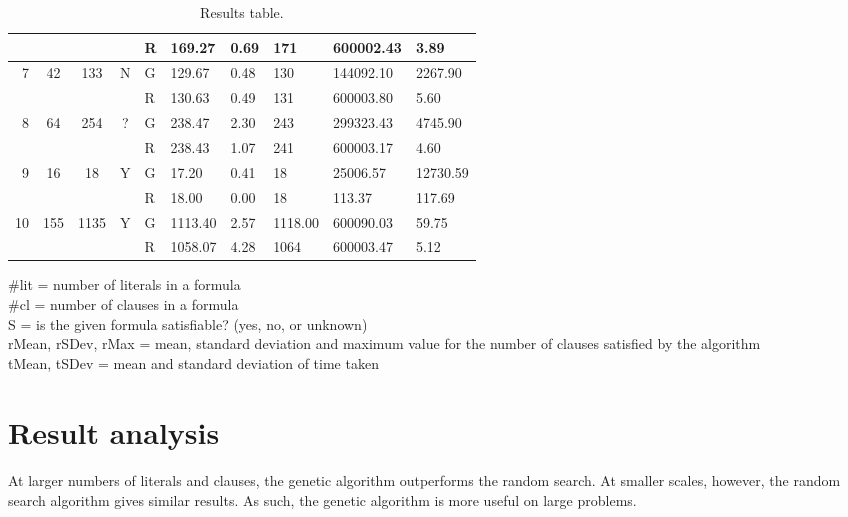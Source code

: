 \documentclass{article}
\begin{document}
\begin{table}[!h]
\begin{tabular}{|r|ccc|l|lll|ll|}
                        &                       &                       &                    & R & 169.27  & 0.69  & 171  & 600002.43 & 3.89    \\ \hline
    \multirow{2}{*}{7}  & \multirow{2}{*}{42}   & \multirow{2}{*}{133}  & \multirow{2}{*}{N} & G & 129.67 & 0.48 & 130 & 144092.10 & 2267.90 \\ \cline{5-10} 
                        &                       &                       &                    & R & 130.63  & 0.49  & 131  & 600003.80 & 5.60    \\ \hline
    \multirow{2}{*}{8}  & \multirow{2}{*}{64}   & \multirow{2}{*}{254}  & \multirow{2}{*}{?} & G & 238.47 & 2.30 & 243 & 299323.43 & 4745.90 \\ \cline{5-10} 
                        &                       &                       &                    & R & 238.43  & 1.07  & 241  & 600003.17 & 4.60    \\ \hline
    \multirow{2}{*}{9}  & \multirow{2}{*}{16}   & \multirow{2}{*}{18}   & \multirow{2}{*}{Y} & G & 17.20 & 0.41 & 18 & 25006.57 & 12730.59 \\ \cline{5-10} 
                        &                       &                       &                    & R & 18.00   & 0.00  & 18   & 113.37    & 117.69  \\ \hline
    \multirow{2}{*}{10} & \multirow{2}{*}{155}  & \multirow{2}{*}{1135} & \multirow{2}{*}{Y} & G & 1113.40 & 2.57 & 1118.00 & 600090.03 & 59.75 \\ \cline{5-10} 
                        &                       &                       &                    & R & 1058.07 & 4.28  & 1064 & 600003.47 & 5.12    \\ \hline
    \end{tabular}
    \caption{Results table.}
    \end{table}
\noindent
\#lit = number of literals in a formula \\
\#cl = number of clauses in a formula \\
S = is the given formula satisfiable? (yes, no, or unknown) \\
rMean, rSDev, rMax = mean, standard deviation and maximum value for the number of clauses satisfied by the algorithm \\
tMean, tSDev = mean and standard deviation of time taken
\section{Result analysis}
\paragraph{}
At larger numbers of literals and clauses, the genetic algorithm outperforms the random search. At smaller scales, however, the random search algorithm gives similar results. As such, the genetic algorithm is more useful on large problems. 
\end{document}
